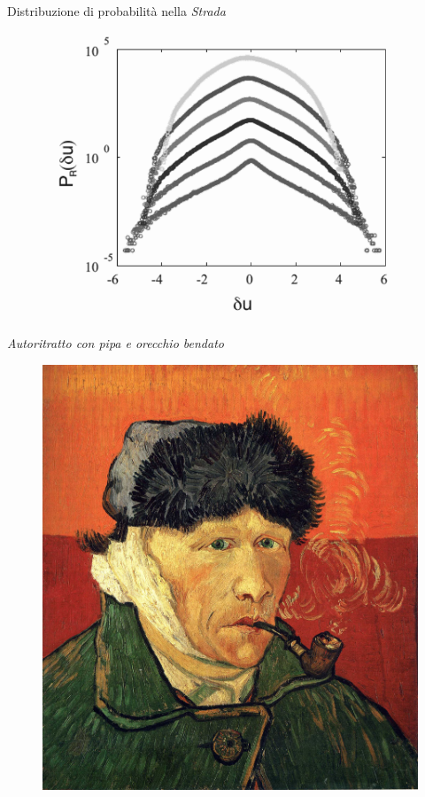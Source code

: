 \documentclass[11pt]{beamer}
\begin{document}
\begin{frame}{Distribuzione di probabilità nella \emph{Strada}}
\begin{figure}
\centering
\includegraphics[scale=0.35]{PDF_road.png}
\end{figure}
\end{frame}

\begin{frame}{\emph{Autoritratto con pipa e orecchio bendato}}
\begin{figure}
\centering
\includegraphics[scale=0.08]{selfportrait.jpg}
\end{figure}
\end{frame}
\end{document}
